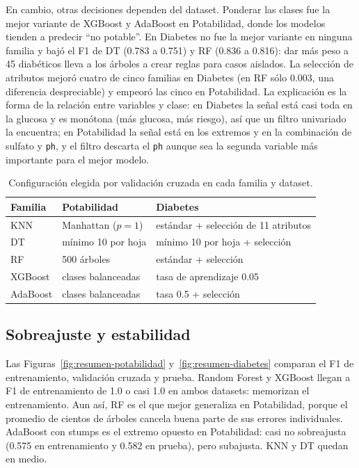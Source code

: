 \documentclass[11pt]{article}
\begin{document}
En cambio, otras decisiones dependen del dataset. Ponderar las clases fue la mejor
variante de XGBoost y AdaBoost en Potabilidad, donde los modelos tienden a predecir
``no potable''. En Diabetes no fue la mejor variante en ninguna familia y bajó el F1 de
DT (0.783 a 0.751) y RF (0.836 a 0.816): dar más peso a 45 diabéticos lleva a los
árboles a crear reglas para casos aislados. La selección de atributos mejoró cuatro
de cinco familias en Diabetes (en RF sólo 0.003, una diferencia despreciable) y empeoró las cinco en Potabilidad. La explicación es la
forma de la relación entre variables y clase: en Diabetes la señal está casi toda en la
glucosa y es monótona (más glucosa, más riesgo), así que un filtro univariado la
encuentra; en Potabilidad la señal está en los extremos y en la combinación de sulfato
y \texttt{ph}, y el filtro descarta el \texttt{ph} aunque sea la segunda variable más
importante para el mejor modelo.

\begin{table}[H]\centering\small
\caption{Configuración elegida por validación cruzada en cada familia y dataset.}
\label{tab:variantes}
\begin{tabular}{lll}\toprule
Familia & Potabilidad & Diabetes \\ \midrule
KNN & Manhattan ($p=1$) & estándar + selección de 11 atributos \\
DT & mínimo 10 por hoja & mínimo 10 por hoja + selección \\
RF & 500 árboles & estándar + selección \\
XGBoost & clases balanceadas & tasa de aprendizaje 0.05 \\
AdaBoost & clases balanceadas & tasa 0.5 + selección \\ \bottomrule
\end{tabular}
\end{table}

\subsection{Sobreajuste y estabilidad}
Las Figuras~\ref{fig:resumen-potabilidad} y~\ref{fig:resumen-diabetes} comparan el F1 de
entrenamiento, validación cruzada y prueba. Random Forest y XGBoost llegan a F1 de
entrenamiento de 1.0 o casi 1.0 en ambos datasets: memorizan el entrenamiento. Aun así,
RF es el que mejor generaliza en Potabilidad, porque el promedio de cientos de árboles
cancela buena parte de sus errores individuales. AdaBoost con stumps es el extremo
opuesto en Potabilidad: casi no sobreajusta (0.575 en entrenamiento y 0.582 en prueba),
pero subajusta. KNN y DT quedan en medio.
\end{document}
